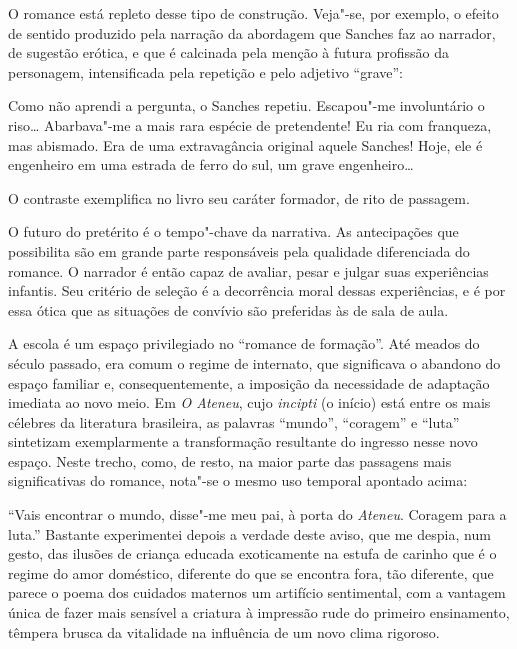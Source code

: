 O romance está repleto desse tipo de construção. Veja"-se, por exemplo,
o efeito de sentido produzido pela narração da abordagem que Sanches
faz ao narrador, de sugestão erótica, e que é calcinada pela menção à
futura profissão da personagem, intensificada pela repetição e pelo
adjetivo ``grave'':

\begin{hedraquote}
Como não aprendi a pergunta, o Sanches repetiu. Escapou"-me
involuntário o riso\ldots{} Abarbava"-me a mais rara espécie de
pretendente! Eu ria com franqueza, mas abismado. Era de uma
extravagância original aquele Sanches! Hoje, ele é engenheiro em uma
estrada de ferro do sul, um grave engenheiro\ldots{} 
\end{hedraquote}

O contraste exemplifica no livro seu caráter formador, de rito de
passagem.

O futuro do pretérito é o tempo"-chave da narrativa. As antecipações
que possibilita são em grande parte responsáveis pela qualidade
diferenciada do romance. O narrador é então capaz de avaliar, pesar e
julgar suas experiências infantis. Seu critério de seleção é a
decorrência moral dessas experiências, e é por essa ótica que as
situações de convívio são preferidas às de sala de aula. 

A escola é um espaço privilegiado no ``romance de
formação''. Até meados do século passado, era comum o regime de
internato, que significava o abandono do espaço familiar e,
consequentemente, a imposição da necessidade de adaptação imediata ao
novo meio. Em \textit{O Ateneu}, cujo
\textit{incipti} (o início) está entre os
mais célebres da literatura brasileira, as palavras ``mundo'', ``coragem''
e ``luta'' sintetizam exemplarmente a transformação resultante do
ingresso nesse novo espaço. Neste trecho, como, de resto, na maior
parte das passagens mais significativas do romance, nota"-se o mesmo
uso temporal apontado acima:

\begin{hedraquote}
``Vais encontrar o mundo, disse"-me meu pai, à porta do
\textit{Ateneu}. Coragem para a luta.''
Bastante experimentei depois a verdade deste aviso, que me despia, num
gesto, das ilusões de criança educada exoticamente na estufa de carinho
que é o regime do amor doméstico, diferente do que se encontra fora,
tão diferente, que parece o poema dos cuidados maternos um artifício
sentimental, com a vantagem única de fazer mais sensível a criatura à
impressão rude do primeiro ensinamento, têmpera brusca da vitalidade na
influência de um novo clima rigoroso.
\end{hedraquote}

